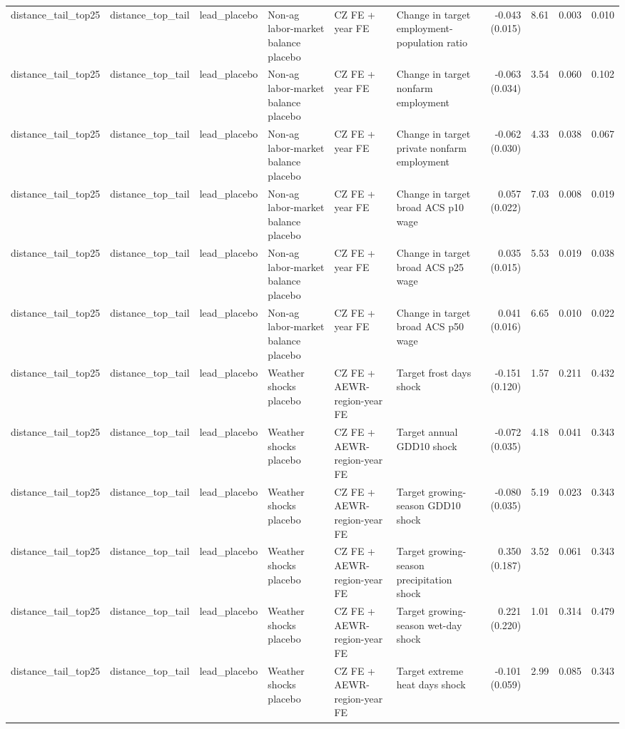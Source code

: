\begin{tabular}{llllllrrrr}
distance_tail_top25 & distance_top_tail & lead_placebo & Non-ag labor-market balance placebo & CZ FE + year FE & Change in target employment-population ratio & -0.043 (0.015) & 8.61 & 0.003 & 0.010 \\
distance_tail_top25 & distance_top_tail & lead_placebo & Non-ag labor-market balance placebo & CZ FE + year FE & Change in target nonfarm employment & -0.063 (0.034) & 3.54 & 0.060 & 0.102 \\
distance_tail_top25 & distance_top_tail & lead_placebo & Non-ag labor-market balance placebo & CZ FE + year FE & Change in target private nonfarm employment & -0.062 (0.030) & 4.33 & 0.038 & 0.067 \\
distance_tail_top25 & distance_top_tail & lead_placebo & Non-ag labor-market balance placebo & CZ FE + year FE & Change in target broad ACS p10 wage & 0.057 (0.022) & 7.03 & 0.008 & 0.019 \\
distance_tail_top25 & distance_top_tail & lead_placebo & Non-ag labor-market balance placebo & CZ FE + year FE & Change in target broad ACS p25 wage & 0.035 (0.015) & 5.53 & 0.019 & 0.038 \\
distance_tail_top25 & distance_top_tail & lead_placebo & Non-ag labor-market balance placebo & CZ FE + year FE & Change in target broad ACS p50 wage & 0.041 (0.016) & 6.65 & 0.010 & 0.022 \\
distance_tail_top25 & distance_top_tail & lead_placebo & Weather shocks placebo & CZ FE + AEWR-region-year FE & Target frost days shock & -0.151 (0.120) & 1.57 & 0.211 & 0.432 \\
distance_tail_top25 & distance_top_tail & lead_placebo & Weather shocks placebo & CZ FE + AEWR-region-year FE & Target annual GDD10 shock & -0.072 (0.035) & 4.18 & 0.041 & 0.343 \\
distance_tail_top25 & distance_top_tail & lead_placebo & Weather shocks placebo & CZ FE + AEWR-region-year FE & Target growing-season GDD10 shock & -0.080 (0.035) & 5.19 & 0.023 & 0.343 \\
distance_tail_top25 & distance_top_tail & lead_placebo & Weather shocks placebo & CZ FE + AEWR-region-year FE & Target growing-season precipitation shock & 0.350 (0.187) & 3.52 & 0.061 & 0.343 \\
distance_tail_top25 & distance_top_tail & lead_placebo & Weather shocks placebo & CZ FE + AEWR-region-year FE & Target growing-season wet-day shock & 0.221 (0.220) & 1.01 & 0.314 & 0.479 \\
distance_tail_top25 & distance_top_tail & lead_placebo & Weather shocks placebo & CZ FE + AEWR-region-year FE & Target extreme heat days shock & -0.101 (0.059) & 2.99 & 0.085 & 0.343 \\

\end{tabular}
